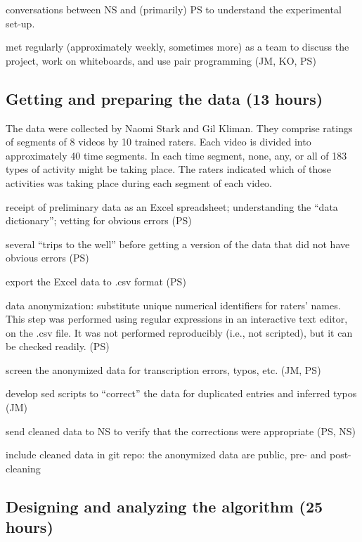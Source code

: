 \documentclass[]{article}
\begin{document}
conversations between NS and (primarily) PS to understand the experimental
set-up.
    
met regularly (approximately weekly, sometimes more) as a team to discuss the
project, work on whiteboards, and use pair programming (JM, KO, PS)
  

\subsection{Getting and preparing the data (13 hours)}

The data were collected by Naomi Stark and Gil Kliman.
They comprise ratings of segments of 8 videos by 10 trained raters.
Each video is divided into approximately 40 time segments.
In each time segment, none, any, or all of 183 types of activity might be
taking place.
The raters indicated which of those activities was taking place during each
segment of each video.

receipt of preliminary data as an Excel spreadsheet; understanding the ``data
dictionary''; vetting for obvious errors (PS)

several ``trips to the well'' before getting a version of the data that did not
have obvious errors (PS)

export the Excel data to .csv format (PS)

data anonymization: substitute unique numerical identifiers for raters' names. 
This step was performed using regular expressions in an interactive text
editor, on the .csv file.
It was not performed reproducibly (i.e., not scripted), but it can be checked
readily. (PS) 

screen the anonymized data for transcription errors, typos, etc. (JM, PS)

develop sed scripts to ``correct'' the data for duplicated entries and inferred
typos (JM)

send cleaned data to NS to verify that the corrections were appropriate (PS, NS)

include cleaned data in git repo: the anonymized data are public, pre- and
post-cleaning
 
\subsection{Designing and analyzing the algorithm (25 hours)}
\end{document}
